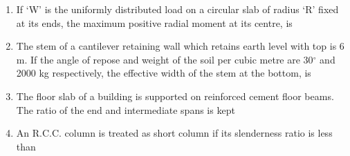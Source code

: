 \documentclass[11pt,a4paper]{article}
\begin{document}
\begin{enumerate}
\\
\item{If `W' is the uniformly distributed load on a circular slab of radius `R' fixed at its ends, the maximum positive radial moment at its centre, is
}
\\
\item{The stem of a cantilever retaining wall which retains earth level with top is 6 m. If the angle of repose and weight of the soil per cubic metre are 30$^\circ$ and 2000 kg respectively, the effective width of the stem at the bottom, is
}
\\
\item{The floor slab of a building is supported on reinforced cement floor beams. The ratio of the end and intermediate spans is kept}
\\
\item{An R.C.C. column is treated as short column if its slenderness ratio is less than}
\\\begin{enumerate*}[itemjoin=\qquad, label=\Alph*.]

\end{enumerate*}
\end{enumerate}
\end{document}
